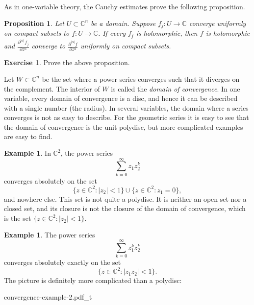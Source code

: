 \documentclass[12pt,openany]{book}
\newcommand{\sabs}[1]{\lvert {#1} \rvert}
\newcommand{\C}{{\mathbb{C}}}
\newcommand{\myindex}[1]{#1\index{#1}}
\theoremstyle{plain}
\newtheorem{prop}[thm]{Proposition}
\theoremstyle{remark}
\theoremstyle{definition}
\newenvironment{exbox}{%
    \def\FrameCommand{\vrule width 1pt \relax\hspace {10pt}}%
    \MakeFramed {\advance \hsize -\width \FrameRestore }%
}{%
    \endMakeFramed
}
\theoremstyle{exercise}
\newtheorem{exercise}{Exercise}[section]
\theoremstyle{example}
\newtheorem{example}[thm]{Example}
\begin{document}
As in one-variable theory, the Cauchy estimates prove the following
proposition.

\begin{prop}
Let $U \subset \C^n$ be a domain.
Suppose $f_j \colon U \to \C$ converge uniformly on compact subsets
to $f \colon U \to \C$.  If every $f_j$ is holomorphic, then $f$ is
holomorphic and 
$\frac{\partial^{\sabs{\alpha}} f_j}{\partial z^\alpha}$ converge to
$\frac{\partial^{\sabs{\alpha}} f}{\partial z^\alpha}$ uniformly on compact
subsets.
\end{prop}

\begin{exbox}
\begin{exercise}
Prove the above proposition.
\end{exercise}
\end{exbox}

Let $W \subset \C^n$ be the set where a power series converges
such that it diverges on the complement.  The interior of $W$
is called the
\emph{\myindex{domain of convergence}}.
In one variable, every domain of convergence is a disc, and hence it can be
described with a single number (the radius).
In several variables, the domain where a series
converges is not as easy to describe.
For the geometric series it is easy to see
that the domain of convergence is the unit polydisc, but more
complicated examples are easy to find.

\begin{example}
In $\C^2$, the power series
\begin{equation*}
\sum_{k=0}^\infty z_1 z_2^k
\end{equation*}
converges absolutely on the set
\begin{equation*}
\bigl\{ z \in \C^2 : \sabs{z_2} < 1 \bigr\}
\cup
\bigl\{ z \in \C^2 : z_1 = 0 \bigr\} ,
\end{equation*}
and nowhere else.
This set is not quite a polydisc.  It is neither an open set nor a closed set,
and its closure is not the closure of the domain of convergence,
which is the set $\bigl\{ z \in \C^2 : \sabs{z_2} < 1 \bigr\}$.
\end{example}

\begin{example}
The power series
\begin{equation*}
\sum_{k=0}^\infty z_1^k z_2^k
\end{equation*}
converges absolutely exactly on the set
\begin{equation*}
\bigl\{ z \in \C^2 : \sabs{z_1 z_2} < 1 \bigr\} .
\end{equation*}
The picture is definitely more complicated than a polydisc:

\medskip

\begin{center}
{convergence-example-2.pdf_t}
\end{center}
\end{example}
\end{document}
